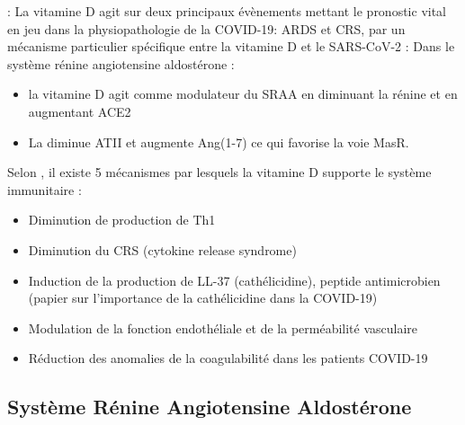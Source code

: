 \documentclass[
  a4paper,
  DIV=11,
  numbers=noendperiod,
  listof=totoc]{scrreprt}
\providecommand{\tightlist}{%
  \setlength{\itemsep}{0pt}\setlength{\parskip}{0pt}}\usepackage{longtable,booktabs,array}
\begin{document}
\textcite{Borsche.2021}: La vitamine D agit sur deux principaux
évènements mettant le pronostic vital en jeu dans la physiopathologie de
la COVID-19: \ac{ARDS} et \ac{CRS}, par un mécanisme particulier
spécifique entre la vitamine D et le SARS-CoV-2 : Dans le système rénine
angiotensine aldostérone :

\begin{itemize}
\tightlist
\item
  la vitamine D agit comme modulateur du \ac{SRAA} en diminuant la
  rénine et en augmentant ACE2
\item
  La diminue ATII et augmente Ang(1-7) ce qui favorise la voie MasR.
\end{itemize}

Selon \textcite{Borsche.2021}, il existe 5 mécanismes par lesquels la
vitamine D supporte le système immunitaire :

\begin{itemize}
\tightlist
\item
  Diminution de production de Th1
\item
  Diminution du \ac{CRS} (cytokine release syndrome)
\item
  Induction de la production de LL-37 (cathélicidine), peptide
  antimicrobien (papier sur l'importance de la cathélicidine dans la
  COVID-19)
\item
  Modulation de la fonction endothéliale et de la perméabilité
  vasculaire
\item
  Réduction des anomalies de la coagulabilité dans les patients COVID-19
\end{itemize}

\subsection{Système Rénine Angiotensine
Aldostérone}\label{systuxe8me-ruxe9nine-angiotensine-aldostuxe9rone}
\end{document}
